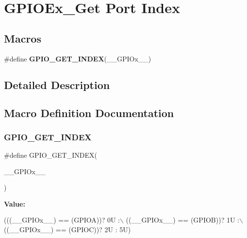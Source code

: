 \hypertarget{group___g_p_i_o_ex___get___port___index}{}\section{G\+P\+I\+O\+Ex\+\_\+\+Get Port Index}
\label{group___g_p_i_o_ex___get___port___index}
\subsection*{Macros}
\begin{DoxyCompactItemize}
\item 
\#define {\bfseries G\+P\+I\+O\+\_\+\+G\+E\+T\+\_\+\+I\+N\+D\+EX}(\+\_\+\+\_\+\+G\+P\+I\+Ox\+\_\+\+\_\+)
\end{DoxyCompactItemize}


\subsection{Detailed Description}


\subsection{Macro Definition Documentation}
\mbox{\label{group___g_p_i_o_ex___get___port___index_ga3830db89326a2268d296a6498fd31384}} 
\subsubsection{\texorpdfstring{G\+P\+I\+O\+\_\+\+G\+E\+T\+\_\+\+I\+N\+D\+EX}{GPIO\_GET\_INDEX}}
{\footnotesize\ttfamily \#define G\+P\+I\+O\+\_\+\+G\+E\+T\+\_\+\+I\+N\+D\+EX(\begin{DoxyParamCaption}\item[{}]{\+\_\+\+\_\+\+G\+P\+I\+Ox\+\_\+\+\_\+ }\end{DoxyParamCaption})}

{\bfseries Value\+:}
\begin{DoxyCode}
(((\_\_GPIOx\_\_) == (GPIOA))? 0U :\(\backslash\)
                                      ((\_\_GPIOx\_\_) == (GPIOB))? 1U :\(\backslash\)
                                      ((\_\_GPIOx\_\_) == (GPIOC))? 2U : 5U)
\end{DoxyCode}
